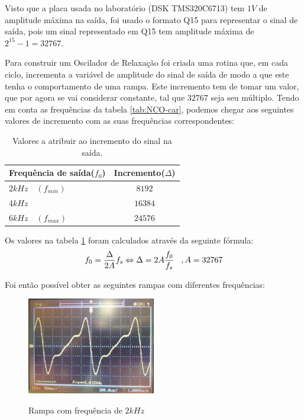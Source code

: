 \documentclass[11pt]{article}
\numberwithin{equation}{section}
\begin{document}
 Visto que a placa usada no laboratório (DSK TMS320C6713) tem $1 V$ de amplitude máxima na saída, foi usado o formato Q15 para representar o sinal de saída, pois um sinal representado em Q15 tem amplitude máxima de $2^{15}-1 = 32767 $.

Para construir um Oscilador de Relaxação foi criada uma rotina que, em cada ciclo, incrementa a variável de amplitude do sinal de saída de modo a que este tenha o comportamento de uma rampa. Este incremento tem de tomar um valor, que por agora se vai considerar constante, tal que $32767$ seja seu múltiplo. Tendo em conta as frequências da tabela \ref{tab:NCO-car}, podemos chegar aos seguintes valores de incremento com as suas frequências correspondentes:


\begin{table}[H]
	\centering
	\caption{Valores a atribuir ao incremento do sinal na saída.}
	\label{tab:incrementos}
	\begin{tabular}[c]{|l||c|}
		\hline \textbf{Frequência de saída($f_0$)} & \textbf{Incremento($\Delta$)}\\ 
		\hline $ 2 kHz \quad (f_{min}) $ & $ 8192 $\\ 
		\hline $ 4 kHz $ & $ 16384 $  \\ 
		\hline $ 6 kHz \quad (f_{max}) $ & $ 24576 $ \\ 
		\hline
	\end{tabular}
\end{table}

Os valores na tabela \ref{tab:incrementos} foram calculados através da seguinte fórmula:
\begin{equation}
 f_{0}= \frac{\Delta}{2A}f_{s} \Leftrightarrow \Delta= 2A\frac{f_{0}}{f_{s}} \hspace{3 mm}, A=32767
\end{equation}

Foi então possível obter as seguintes rampas com diferentes frequências:


\begin{figure}[H]
	\centering
	\includegraphics[width=0.5\textwidth]{./P1_2kHz}~\\
	\caption{Rampa com frequência de $ 2 kHz $}
\end{figure}
\end{document}
